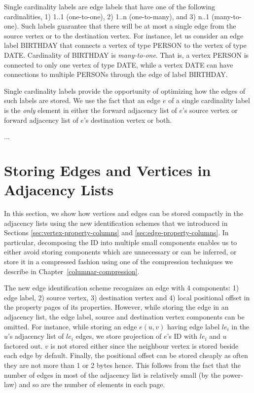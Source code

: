 Single cardinality labels are edge labels that have one of the following cardinalities, 1) 1..1 (one-to-one), 2) 1..n (one-to-many), and 3) n..1 (many-to-one). Such labels guarantee that there will be at most a single edge from the source vertex or to the destination vertex. For instance, let us consider an edge label BIRTHDAY that connects a vertex of type PERSON to the vertex of type DATE. Cardinality of BIRTHDAY is \emph{many-to-one}. That is, a vertex PERSON is connected to only one vertex of type DATE, while a vertex DATE can have connections to multiple PERSONs through the edge of label BIRTHDAY.

Single cardinality labels provide the opportunity of optimizing how the edges of such labels are stored. We use the fact that an edge $e$ of a single cardinality label is the \emph{only} element in either the forward adjacency list of $e$'s source vertex or forward adjacency list of $e$'s destination vertex or both. 

...


\section{Storing Edges and Vertices in Adjacency Lists}
\label{sec:storage-optimizations}

In this section, we show how vertices and edges can be stored compactly in the adjacency lists using the new identification schemes that we introduced in Sections \ref{sec:vertex-property-columns} and \ref{sec:edge-property-columns}. In particular, decomposing the ID into multiple small components enables us to either avoid storing components which are unnecessary or can be inferred, or store it in a compressed fashion using one of the compression techniques we describe in Chapter~\ref{columnar-compression}.

The new edge identification scheme recognizes an edge with 4 components: 1) edge label, 2) source vertex, 3) destination vertex and 4) local positional offset in the property pages of its properties. However, while storing the edge in an adjacency list, the edge label, source and destination vertex components can be omitted. For instance, while storing an edge $e(u,v)$ having edge label $le_i$ in the $u$'s adjacency list of $le_i$ edges, we store projection of $e$'s ID with $le_i$ and $u$ factored out. $v$ is not stored either since the neighbour vertex is stored beside each edge by default. Finally, the positional offset can be stored cheaply as often they are not more than 1 or 2 bytes hence. This follows from the fact that the number of edges in most of the adjacency list is relatively small (by the power-law) and so are the number of elements in each page. 


